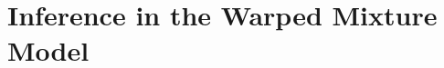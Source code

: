 \\ \vspace{1cm} \\
\\ \vspace{1cm} \\
\\ \vspace{1cm} \\
\\ \vspace{1cm} \\
\\ \vspace{1cm} \\
\\ \vspace{1cm} \\
\\ \vspace{1cm} \\
\\ \vspace{1cm} \\
\\ \vspace{1cm} \\
\\ \vspace{1cm} \\
\\ \vspace{1cm} \\











\chapter{Inference in the Warped Mixture Model}
\label{ch:warped-appendix}


